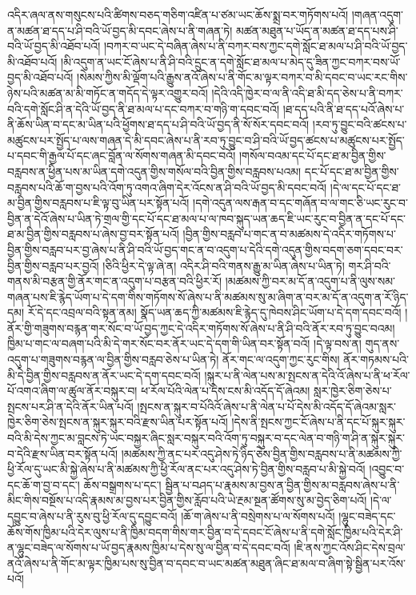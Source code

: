 འདིར་ཞལ་ནས་གསུངས་པའི་ཚིགས་བཅད་གཅིག་འཛིན་པ་ཙམ་ཡང་ཆོས་སྨྲ་བར་གཏོགས་པའོ། །གཞན་འདུག་ན་མཚན་ཐ་དད་པ་ཤི་བའི་ཡོ་བྱད་མི་དབང་ཞེས་པ་ནི་གཞན་ཏེ། མཚན་མཐུན་པ་ཡོད་ན་མཚན་ཐ་དད་པས་ཤི་བའི་ཡོ་བྱད་མི་འཐོབ་པའོ། །བཀར་བ་ཡང་དེ་བཞིན་ཞེས་པ་ནི་བཀར་བས་ཀྱང་དགེ་སློང་ཐ་མལ་པ་ཤི་བའི་ཡོ་བྱད་མི་འཐོབ་པའོ། །མི་འདུག་ན་ཡང་ངོ་ཞེས་པ་ནི་ཤི་བའི་དྲུང་ན་དགེ་སློང་ཐ་མལ་པ་མེད་དུ་ཟིན་ཀྱང་བཀར་བས་ཡོ་བྱད་མི་འཐོབ་པའོ། །སེམས་ཀྱིས་མི་ལྡོག་པའི་རྒྱུས་ནའོ་ཞེས་པ་ནི་གོང་མ་ལྟར་བཀར་བ་མི་དབང་བ་ཡང་རང་གིས་ཉེས་པའི་མཚན་མ་མི་གཏོང་ན་གདོད་དེ་ལྟར་འགྱུར་བའོ། །དེའི་འདི་ཁྱེར་བ་ལ་ནི་འདི་ཐ་མི་དད་ཅེས་པ་ནི་བཀར་བའི་དགེ་སློང་ཤི་ན་དེའི་ཡོ་བྱད་ནི་ཐ་མལ་པ་དང་བཀར་བ་གཉི་ག་དབང་བའོ། །ཐ་དད་པའི་ནི་ཐ་དད་པའོ་ཞེས་པ་ནི་ཆོས་ཡིན་བ་དང་མ་ཡིན་པའི་ཕྱོགས་ཐ་དད་པ་ཤི་བའི་ཡོ་བྱད་ནི་སོ་སོར་དབང་བའོ། །རབ་ཏུ་བྱུང་བའི་ཚངས་པ་མཚུངས་པར་སྤྱོད་པ་ལས་གཞན་དེ་མི་དབང་ཞེས་པ་ནི་རབ་ཏུ་བྱུང་བ་ཤི་བའི་ཡོ་བྱད་ཚངས་པ་མཚུངས་པར་སྤྱོད་པ་དབང་གི་རྒྱལ་པོ་དང་ཞང་བློན་ལ་སོགས་གཞན་མི་དབང་བའོ། །གསོལ་བའམ་དང་པོ་དང་ཐ་མ་བྱིན་གྱིས་བརླབས་ན་ཕྱིན་པས་མ་ཡིན་དགེ་འདུན་གྱིས་གསོལ་བའི་བྱིན་གྱིས་བརླབས་པའམ། དང་པོ་དང་ཐ་མ་བྱིན་གྱིས་བརླབས་པའི་ཆོ་ག་བྱས་པའི་འོག་ཏུ་འགའ་ཞིག་དེར་འོངས་ན་ཤི་བའི་ཡོ་བྱད་མི་དབང་བའོ། །དེ་ལ་དང་པོ་དང་ཐ་མ་བྱིན་གྱིས་བརླབས་པ་ཇི་ལྟ་བུ་ཡིན་པར་སྟོན་པའོ། །དགེ་འདུན་ལས་རྒན་བ་དང་གཞོན་བ་ལ་གང་ཅི་ཡང་རུང་བ་བྱིན་ན་དེའོ་ཞེས་པ་ཡིན་ཏེ་གྲལ་གྱི་དང་པོ་དང་ཐ་མལ་པ་ལ་ཁབ་སྐུད་ཡན་ཆད་ཇི་ཡང་རུང་བ་བྱིན་ན་དང་པོ་དང་ཐ་མ་བྱིན་གྱིས་བརླབས་པ་ཞེས་བྱ་བར་སྟོན་པའོ། །བྱིན་གྱིས་བརླབ་པ་གང་ན་བ་མཚམས་དེ་འདིར་གཏོགས་པ་བྱིན་གྱིས་བརླབ་པར་བྱ་ཞེས་པ་ནི་ཤི་བའི་ཡོ་བྱད་གང་ན་བ་འདུག་པ་དེའི་དགེ་འདུན་གྱིས་བདག་ཅག་དབང་བར་བྱིན་གྱིས་བརླབ་པར་བྱའོ། །ཅིའི་ཕྱིར་དེ་ལྟ་ཞེ་ན། འདིར་ཤི་བའི་གནས་རྒྱུ་མ་ཡིན་ཞེས་པ་ཡིན་ཏེ། གར་ཤི་བའི་གནས་མི་བརྩན་གྱི་ནོར་གང་ན་འདུག་པ་བརྩན་བའི་ཕྱིར་རོ། །མཚམས་ཀྱི་བར་མ་དོ་ན་འདུག་པ་ནི་ལུས་སམ་གཞན་པས་ཇི་རྙེད་ཡོག་པ་དེ་དག་གིས་གཏོགས་སོ་ཞེས་པ་ནི་མཚམས་སུ་མ་ཞིག་ན་བར་མ་དོ་ན་འདུག་ན་རོ་ཉིད་དམ། རོ་དེ་དང་འབྲལ་བའི་སྟན་ནམ། སྣོད་ཡན་ཆད་ཀྱི་མཚམས་ཇི་རྙེད་དུ་ཁེབས་ཤིང་ཡོག་པ་དེ་དག་དབང་བའོ། །ནོར་གྱི་གཟུགས་བརྙན་གར་སོང་བ་ཡོ་བྱད་ཀྱང་དེ་འདིར་གཏོགས་སོ་ཞེས་པ་ནི་ཤི་བའི་ནོར་རབ་ཏུ་བྱུང་བའམ། ཁྱིམ་པ་གང་ལ་བཞག་པའི་མི་དེ་གར་སོང་བར་ནོར་ཡང་དེ་དག་གི་ཡིན་བར་སྟོན་བའོ། །དེ་ལྟ་བས་ན། གུད་ནས་འདུག་པ་གཟུགས་བརྙན་ལ་བྱིན་གྱིས་བརླབ་ཅེས་པ་ཡིན་ཏེ། ནོར་གང་ལ་འདུག་ཀྱང་རུང་གིས། ནོར་གཏམས་པའི་མི་དེ་བྱིན་གྱིས་བརླབས་ན་ནོར་ཡང་དེ་དག་དབང་བའོ། །སྐུར་པ་ནི་ལེན་པས་མ་སྤངས་ན་དེའི་འོ་ཞེས་པ་ནི་ཕ་རོལ་པོ་འགའ་ཞིག་ལ་ཚུལ་ནོར་བསྐུར་བ། ཕ་རོལ་པོའི་ལེན་པ་དེས་ངས་མི་འདོད་དོ་ཞེའམ། སླར་ཁྱེར་ཅིག་ཅེས་པ་སྤངས་པར་ཤི་ན་དེའི་ནོར་ཡིན་པའོ། །སྤངས་ན་སྐུར་བ་པོའིའོ་ཞེས་པ་ནི་ལེན་པ་པོ་དེས་མི་འདོད་དོ་ཞེའམ་སླར་ཁྱེར་ཅིག་ཅེས་སྤངས་ན་སྐུར་སྐུར་བའི་རྫས་ཡིན་པར་སྟོན་པའོ། །དེས་ནི་སྤངས་ཀྱང་ངོ་ཞེས་པ་ནི་དང་པོ་སྐུར་སྐུར་བའི་མི་དེས་ཀྱང་མ་བླངས་ཏེ་ཡང་བསྐྱར་ཞིང་སླར་བསྐུར་བའི་འོག་ཏུ་བསྐུར་བ་དང་ལེན་བ་གཉི་ག་ཤི་ན་སྐུར་སྐུར་བ་དེའི་རྫས་ཡིན་བར་སྟོན་པའོ། །མཚམས་ཀྱི་ནང་པར་འདུ་ཤེས་ཏེ་ཉིད་ཅེས་བྱིན་གྱིས་བརླབས་པ་ནི་མཚམས་ཀྱི་ཕྱི་རོལ་དུ་ཡང་མི་སྐྱེ་ཞེས་པ་ནི་མཚམས་ཀྱི་ཕྱི་རོལ་ནང་པར་འདུ་ཤེས་ཏེ་བྱིན་གྱིས་བརླབ་པ་མི་སྐྱེ་བའོ། །འབྱུང་བ་དང་ཆོ་ག་བྱ་བ་དང་། ཆོས་བསྒྲགས་པ་དང་། སྦྱིན་པ་བཤད་པ་རྣམས་མ་བྱས་ན་བྱིན་གྱིས་མ་བརླབས་ཞེས་པ་ནི་མིང་གིས་བསྔོས་པ་འདི་རྣམས་མ་བྱས་པར་བྱིན་གྱིས་རློབ་པའི་ཡེ་རྔམ་སྔན་ཚོགས་སུ་མ་བྱེད་ཅིག་པའོ། །དེ་ལ་དབྱུང་བ་ཞེས་པ་ནི་རུས་བུ་ཕྱི་རོལ་དུ་དབྱུང་བའོ། །ཆོ་ག་ཞེས་པ་ནི་བསྲེགས་པ་ལ་སོགས་པའོ། །ལྷུང་བཟེད་དང་ཆོས་གོས་ཁྱིམ་པའི་དེར་ལུས་པ་ནི་ཁྱིམ་བདག་གིས་གར་བྱིན་བ་དེ་དབང་ངོ་ཞེས་པ་ནི་དགེ་སློང་ཁྱིམ་པའི་དེར་ཤི་ན་ལྷུང་བཟེད་ལ་སོགས་པ་ཡོ་བྱད་རྣམས་ཁྱིམ་པ་དེས་སུ་ལ་བྱིན་བ་དེ་དབང་བའོ། །ཇི་ནས་ཀྱང་འོས་ཤིང་དེས་བྲལ་ནའོ་ཞེས་པ་ནི་གོང་མ་ལྟར་ཁྱིམ་པས་སུ་བྱིན་བ་དབང་བ་ཡང་མཚན་མཐུན་ཞིང་ཐ་མལ་བ་ཞིག་སྟེ་སྦྱིན་པར་འོས་པའོ། 
